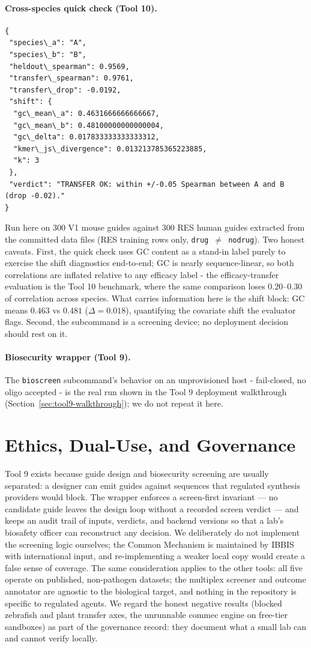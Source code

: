 \documentclass[12pt]{article}
\begin{document}
\paragraph{Cross-species quick check (Tool 10).}
\begin{verbatim}
{
 "species\_a": "A",
 "species\_b": "B",
 "heldout\_spearman": 0.9569,
 "transfer\_spearman": 0.9761,
 "transfer\_drop": -0.0192,
 "shift": {
  "gc\_mean\_a": 0.4631666666666667,
  "gc\_mean\_b": 0.48100000000000004,
  "gc\_delta": 0.017833333333333312,
  "kmer\_js\_divergence": 0.013213785365223885,
  "k": 3
 },
 "verdict": "TRANSFER OK: within +/-0.05 Spearman between A and B (drop -0.02)."
}
\end{verbatim}
Run here on 300 V1 mouse guides against 300 RES human guides extracted
from the committed data files (RES training rows only, \texttt{drug
$\neq$ nodrug}). Two honest caveats. First, the quick check uses GC
content as a stand-in label purely to exercise the shift diagnostics
end-to-end; GC is nearly sequence-linear, so both correlations are
inflated relative to any efficacy label - the efficacy-transfer
evaluation is the Tool 10 benchmark, where the same comparison loses
$0.20$--$0.30$ of correlation across species. What carries information
here is the shift block: GC means $0.463$ vs $0.481$
($\Delta = 0.018$), quantifying the covariate shift the evaluator
flags. Second, the subcommand is a screening device; no deployment
decision should rest on it.

\paragraph{Biosecurity wrapper (Tool 9).}
The \texttt{bioscreen} subcommand's behavior on an unprovisioned host -
fail-closed, no oligo accepted - is the real run shown in the Tool 9
deployment walkthrough (Section~\ref{sec:tool9-walkthrough}); we do not
repeat it here.

\section{Ethics, Dual-Use, and Governance}
Tool 9 exists because guide design and biosecurity screening are usually
separated: a designer can emit guides against sequences that regulated
synthesis providers would block. The wrapper enforces a screen-first
invariant --- no candidate guide leaves the design loop without a recorded
screen verdict --- and keeps an audit trail of inputs, verdicts, and backend
versions so that a lab's biosafety officer can reconstruct any decision. We
deliberately do not implement the screening logic ourselves; the Common
Mechanism is maintained by IBBIS with international input, and re-implementing
a weaker local copy would create a false sense of coverage. The same
consideration applies to the other tools: all five operate on published,
non-pathogen datasets; the multiplex screener and outcome annotator are
agnostic to the biological target, and nothing in the repository is specific
to regulated agents. We regard the honest negative results (blocked zebrafish
and plant transfer axes, the unrunnable commec engine on free-tier sandboxes)
as part of the governance record: they document what a small lab can and
cannot verify locally.
\end{document}
